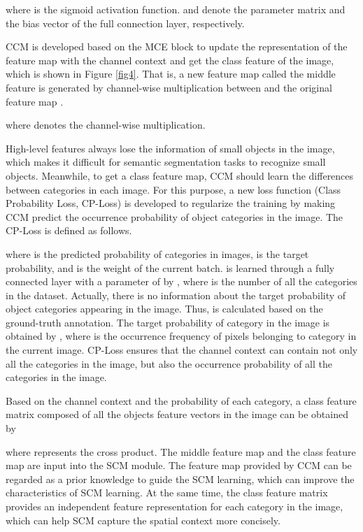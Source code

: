 \documentclass[10pt,journal,cspaper,compsoc]{IEEEtran}
\begin{document}
where  is the sigmoid activation function.  and  denote the parameter matrix and the bias vector of the full connection layer, respectively.
	
CCM is developed based on the MCE block to update the representation of the feature map with the channel context and get the class feature of the image, which is shown in Figure \ref{fig4}. That is, a new feature map called the middle feature  is generated by channel-wise multiplication between  and the original feature map .

where  denotes the channel-wise multiplication.
	
High-level features always lose the information of small objects in the image, which makes it difficult for semantic segmentation tasks to recognize small objects. Meanwhile, to get a class feature map, CCM should learn the differences between categories in each image. For this purpose, a new loss function (Class Probability Loss, CP-Loss) is developed to regularize the training by making CCM predict the occurrence probability of object categories in the image. The CP-Loss is defined as follows.

where  is the predicted probability of categories in images,  is the target probability, and  is the weight of the current batch.  is learned through a fully connected layer with a parameter of  by , where  is the number of all the categories in the dataset. Actually, there is no information about the target probability of object categories appearing in the image. Thus,  is calculated based on the ground-truth annotation. The target probability of category  in the image is obtained by , where  is the occurrence frequency of pixels belonging to category  in the current image. CP-Loss ensures that the channel context can contain not only all the categories in the image, but also the occurrence probability of all the categories in the image.
	
Based on the channel context  and the probability  of each category, a class feature matrix  composed of all the objects feature vectors in the image can be obtained by

where  represents the cross product. The middle feature map  and the class feature map  are input into the SCM module. The feature map provided by CCM can be regarded as a prior knowledge to guide the SCM learning, which can improve the characteristics of SCM learning. At the same time, the class feature matrix provides an independent feature representation for each category in the image, which can help SCM capture the spatial context more concisely.
	
\end{document}
